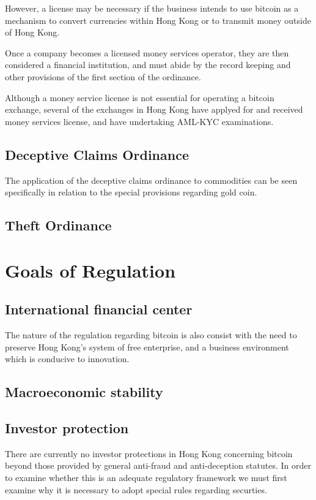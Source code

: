 However, a license may be necessary if the business intends to use
bitcoin as a mechanism to convert currencies within Hong Kong or to
transmit money outside of Hong Kong.

Once a company becomes a licensed money services operator, they are
then considered a financial institution, and must abide by the record
keeping and other provisions of the first section of the ordinance.

Although a money service license is not essential for operating a
bitcoin exchange, several of the exchanges in Hong Kong have applyed
for and received money services license, and have undertaking AML-KYC
examinations. 

\subsection{Deceptive Claims Ordinance}

The application of the deceptive claims ordinance to commodities can
be seen specifically in relation to the special provisions regarding
gold coin.

\subsection{Theft Ordinance}

\section{Goals of Regulation}

\subsection{International financial center}

The nature of the regulation regarding bitcoin is also consist with
the need to preserve Hong Kong's system of free enterprise, and a
business environment which is conducive to innovation.

\subsection{Macroeconomic stability}

\subsection{Investor protection}
There are currently no investor protections in Hong Kong concerning
bitcoin beyond those provided by general anti-fraud and anti-deception
statutes.  In order to examine whether this is an adequate regulatory
framework we must first examine why it is necessary to adopt special
rules regarding securties.

